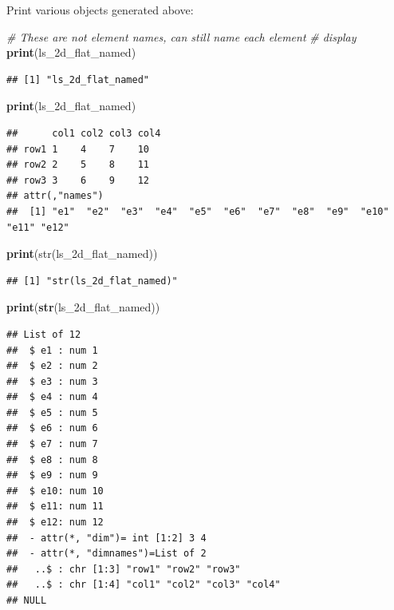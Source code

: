 \documentclass[
]{book}
\newenvironment{Shaded}{\begin{snugshade}}{\end{snugshade}}
\newcommand{\CommentTok}[1]{\textcolor[rgb]{0.56,0.35,0.01}{\textit{#1}}}
\newcommand{\KeywordTok}[1]{\textcolor[rgb]{0.13,0.29,0.53}{\textbf{#1}}}
\newcommand{\NormalTok}[1]{#1}
\newcommand{\StringTok}[1]{\textcolor[rgb]{0.31,0.60,0.02}{#1}}
\begin{document}
Print various objects generated above:

\begin{Shaded}
\begin{Highlighting}[]
\CommentTok{\# These are not element names, can still name each element}
\CommentTok{\# display}
\KeywordTok{print}\NormalTok{(}\StringTok{\textquotesingle{}ls\_2d\_flat\_named\textquotesingle{}}\NormalTok{)}
\end{Highlighting}
\end{Shaded}

\begin{verbatim}
## [1] "ls_2d_flat_named"
\end{verbatim}

\begin{Shaded}
\begin{Highlighting}[]
\KeywordTok{print}\NormalTok{(ls\_2d\_flat\_named)}
\end{Highlighting}
\end{Shaded}

\begin{verbatim}
##      col1 col2 col3 col4
## row1 1    4    7    10  
## row2 2    5    8    11  
## row3 3    6    9    12  
## attr(,"names")
##  [1] "e1"  "e2"  "e3"  "e4"  "e5"  "e6"  "e7"  "e8"  "e9"  "e10" "e11" "e12"
\end{verbatim}

\begin{Shaded}
\begin{Highlighting}[]
\KeywordTok{print}\NormalTok{(}\StringTok{\textquotesingle{}str(ls\_2d\_flat\_named)\textquotesingle{}}\NormalTok{)}
\end{Highlighting}
\end{Shaded}

\begin{verbatim}
## [1] "str(ls_2d_flat_named)"
\end{verbatim}

\begin{Shaded}
\begin{Highlighting}[]
\KeywordTok{print}\NormalTok{(}\KeywordTok{str}\NormalTok{(ls\_2d\_flat\_named))}
\end{Highlighting}
\end{Shaded}

\begin{verbatim}
## List of 12
##  $ e1 : num 1
##  $ e2 : num 2
##  $ e3 : num 3
##  $ e4 : num 4
##  $ e5 : num 5
##  $ e6 : num 6
##  $ e7 : num 7
##  $ e8 : num 8
##  $ e9 : num 9
##  $ e10: num 10
##  $ e11: num 11
##  $ e12: num 12
##  - attr(*, "dim")= int [1:2] 3 4
##  - attr(*, "dimnames")=List of 2
##   ..$ : chr [1:3] "row1" "row2" "row3"
##   ..$ : chr [1:4] "col1" "col2" "col3" "col4"
## NULL
\end{verbatim}
\end{document}
